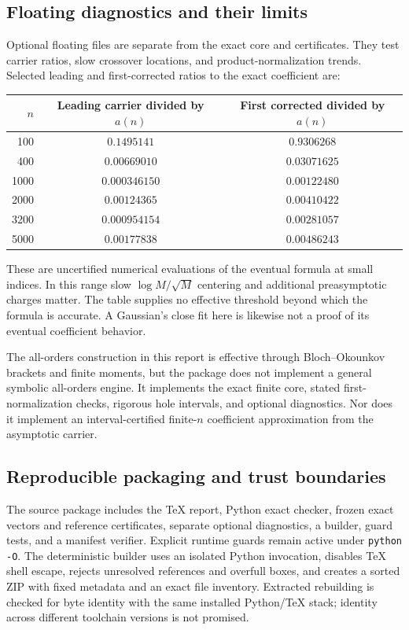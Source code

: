 \documentclass[11pt]{article}
\theoremstyle{remark}\newtheorem{remark}[theorem]{Remark}
\begin{document}
\subsection{Floating diagnostics and their limits}\label{stp:sum:sub:floating}
Optional floating files are separate from the exact core and certificates. They test carrier ratios, slow crossover locations, and product-normalization trends. Selected leading and first-corrected ratios to the exact coefficient are:
\begin{center}
\begin{tabular}{rcc}
\toprule
$n$ & Leading carrier divided by $a(n)$ & First corrected divided by $a(n)$\\
\midrule
100 & $0.1495141$ & $0.9306268$\\
400 & $0.00669010$ & $0.03071625$\\
1000 & $0.000346150$ & $0.00122480$\\
2000 & $0.00124365$ & $0.00410422$\\
3200 & $0.000954154$ & $0.00281057$\\
5000 & $0.00177838$ & $0.00486243$\\
\bottomrule
\end{tabular}
\end{center}
These are uncertified numerical evaluations of the eventual formula at small indices. In this range slow $\log M/\sqrt M$ centering and additional preasymptotic charges matter. The table supplies no effective threshold beyond which the formula is accurate. A Gaussian's close fit here is likewise not a proof of its eventual coefficient behavior.

The all-orders construction in this report is effective through Bloch--Okounkov brackets and finite moments, but the package does not implement a general symbolic all-orders engine. It implements the exact finite core, stated first-normalization checks, rigorous hole intervals, and optional diagnostics. Nor does it implement an interval-certified finite-$n$ coefficient approximation from the asymptotic carrier.

\subsection{Reproducible packaging and trust boundaries}
The source package includes the TeX report, Python exact checker, frozen exact vectors and reference certificates, separate optional diagnostics, a builder, guard tests, and a manifest verifier. Explicit runtime guards remain active under \texttt{python -O}. The deterministic builder uses an isolated Python invocation, disables TeX shell escape, rejects unresolved references and overfull boxes, and creates a sorted ZIP with fixed metadata and an exact file inventory. Extracted rebuilding is checked for byte identity with the same installed Python/TeX stack; identity across different toolchain versions is not promised.
\end{document}
